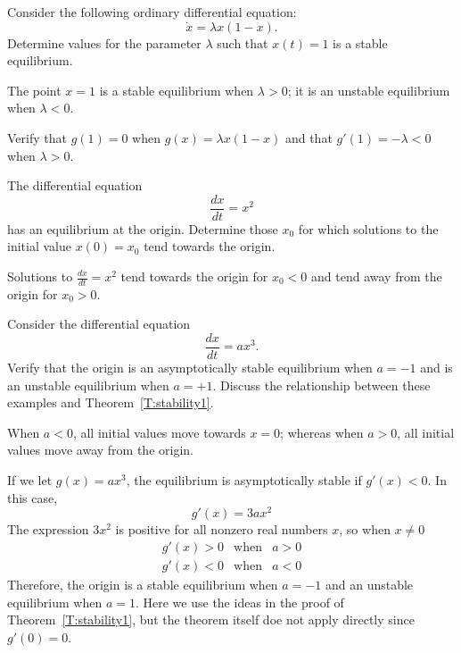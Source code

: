 \documentclass{ximera}
\begin{document}
\begin{exercise} \label{c3.3.3}
Consider the following ordinary differential equation:
\[
\dot{x} = \lambda x(1-x).
\]
Determine values for the parameter $\lambda$ such
that $x(t)=1$ is a stable equilibrium.

\begin{solution}

\ans The point $x = 1$ is a stable equilibrium when $\lambda > 0$; it is
an unstable equilibrium when $\lambda < 0$. 

\soln Verify that $g(1) = 0$ when $g(x) = \lambda x(1-x)$ and that $g'(1) = -\lambda<0$ when $\lambda>0$. 

\end{solution}
\end{exercise}


\begin{exercise} \label{c3.3.4}
The differential equation
\[
\frac{dx}{dt} =  x^2
\]
has an equilibrium at the origin.  Determine
those $x_0$ for which solutions to the initial value $x(0)=x_0$ tend
towards the origin.

\begin{solution}
Solutions to $\frac{dx}{dt} = x^2$ tend towards the origin for $x_0 < 0$
and tend away from the origin for $x_0 > 0$.
\end{solution}
\end{exercise}


\begin{exercise} \label{c3.3.5}
Consider the differential equation
\[
\frac{dx}{dt} = a x^3.
\]
Verify that the origin is an asymptotically
stable equilibrium when $a = -1$ and is an unstable
equilibrium when $a = +1$. Discuss the relationship
between these examples and Theorem~\ref{T:stability1}.

\begin{solution}

\ans When $a < 0$, all initial values move towards $x = 0$; whereas
when $a > 0$, all initial values move away from the origin. 

\soln If we let $g(x) = a x^3$, the equilibrium is asymptotically stable if $g'(x) < 0$.  In this case,
\[
g'(x) = 3a x^2
\]
The expression $3x^2$ is positive for all nonzero real numbers $x$, so
when $x \neq 0$
\[ \begin{array}{ccc}
g'(x) > 0 & \mbox{when} & a > 0 \\
g'(x) < 0 & \mbox{when} & a < 0 \end{array}
\]
Therefore, the origin is a stable equilibrium when $a = -1$ and
an unstable equilibrium when $a = 1$.  Here we use the ideas in the proof of Theorem~\ref{T:stability1}, but the theorem itself doe not apply directly since $g'(0)=0$.

\end{solution}
\end{exercise}
\end{document}
